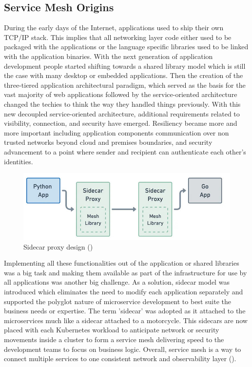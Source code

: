 \subsection{Service Mesh Origins}
During the early days of the Internet, applications used to ship their own TCP/IP stack. This implies that all networking layer code either used to be packaged with the applications or the language specific libraries used to be linked with the application binaries. With the next generation of application development people started shifting towards a shared library model which is still the case with many desktop or embedded applications. Then the creation of the three-tiered application architectural paradigm, which served as the basis for the vast majority of web applications followed by the service-oriented architecture changed the techies to think the way they handled things previously. With this new decoupled service-oriented architecture, additional requirements related to visibility, connection, and security have emerged. Resiliency became more and more important including application components communication over non trusted networks beyond cloud and premises boundaries, and security advancement to a point where sender and recipient can authenticate each other's identities.

\begin{figure}[ht!]
    \centering
    \includegraphics[width=0.7\linewidth]{resources/sidecar-design.jpg}
    \caption{Sidecar proxy design (\cite{isovalentGraf2021})}
    \label{lr:sidecarDesign}
\end{figure}

Implementing all these functionalities out of the application or shared libraries was a big task and making them available as part of the infrastructure for use by all applications was another big challenge. As a solution, sidecar model was introduced which eliminates the need to modify each application separately and supported the polyglot nature of microservice development to best suite the business needs or expertise. The term 'sidecar' was adopted as it attached to the microservices much like a sidecar attached to a motorcycle. This sidecars are now placed with each Kubernetes workload to anticipate network or security movements inside a cluster to form a service mesh delivering speed to the development teams to focus on business logic. Overall, service mesh is a way to connect multiple services to one consistent network and observability layer (\cite{posedioNeumer2021}).

